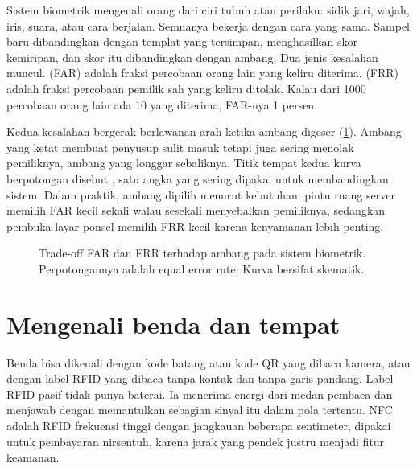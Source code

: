 Sistem biometrik mengenali orang dari ciri tubuh atau perilaku: sidik jari, wajah, iris, suara, atau cara berjalan.
Semuanya bekerja dengan cara yang sama. Sampel baru dibandingkan dengan templat yang tersimpan, menghasilkan skor
kemiripan, dan skor itu dibandingkan dengan ambang. Dua jenis kesalahan muncul.  (FAR)
adalah fraksi percobaan orang lain yang keliru diterima.  (FRR) adalah fraksi percobaan
pemilik sah yang keliru ditolak. Kalau dari 1000 percobaan orang lain ada 10 yang diterima, FAR-nya 1 persen.

Kedua kesalahan bergerak berlawanan arah ketika ambang digeser (\cref{fig:eer}). Ambang yang ketat membuat
penyusup sulit masuk tetapi juga sering menolak pemiliknya, ambang yang longgar sebaliknya. Titik tempat kedua kurva
berpotongan disebut , satu angka yang sering dipakai untuk membandingkan sistem. Dalam
praktik, ambang dipilih menurut kebutuhan: pintu ruang server memilih FAR kecil sekali walau sesekali menyebalkan
pemiliknya, sedangkan pembuka layar ponsel memilih FRR kecil karena kenyamanan lebih penting.

\begin{figure}[ht]
\centering
{}
\caption{Trade-off FAR dan FRR terhadap ambang pada sistem biometrik. Perpotongannya adalah equal error rate.
Kurva bersifat skematik.}
\label{fig:eer}
\end{figure}

\section{Mengenali benda dan tempat}

Benda bisa dikenali dengan kode batang atau kode QR yang dibaca kamera, atau dengan label RFID yang dibaca tanpa
kontak dan tanpa garis pandang. Label RFID pasif tidak punya baterai. Ia menerima energi dari medan pembaca dan
menjawab dengan memantulkan sebagian sinyal itu dalam pola tertentu. NFC adalah RFID frekuensi tinggi dengan
jangkauan beberapa sentimeter, dipakai untuk pembayaran nirsentuh, karena jarak yang pendek justru menjadi fitur
keamanan.

